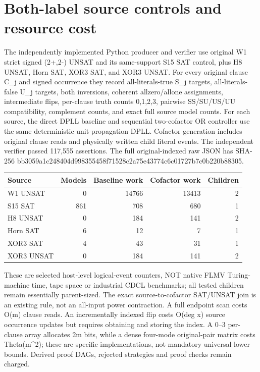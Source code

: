 \documentclass[11pt]{article}
\begin{document}
\section{Both-label source controls and resource cost}
The independently implemented Python producer and verifier use original W1 strict signed (2+,2-) UNSAT and its same-support S15 SAT control, plus H8 UNSAT, Horn SAT, XOR3 SAT, and XOR3 UNSAT. For every original clause C_j and signed occurrence they record all-literals-true S_j targets, all-literals-false U_j targets, both inversions, coherent allzero/allone assignments, intermediate flips, per-clause truth counts 0,1,2,3, pairwise SS/SU/US/UU compatibility, complement counts, and exact full source model counts. For each source, the direct DPLL baseline and sequential two-cofactor OR controller use the same deterministic unit-propagation DPLL. Cofactor generation includes original clause reads and physically written child literal events. The independent verifier passed 117,555 assertions. The full original-indexed raw JSON has SHA-256 bb3059a1c248404d998355458f71528c2a75e43774c6c01727b7c0b220b88305.

\begin{center}\begin{tabular}{lrrrr}\toprule
Source&Models&Baseline work&Cofactor work&Children\\\midrule
W1 UNSAT&0&14766&13413&2\\
S15 SAT&861&708&680&1\\
H8 UNSAT&0&184&141&2\\
Horn SAT&6&12&7&1\\
XOR3 SAT&4&43&31&1\\
XOR3 UNSAT&0&184&141&2\\\bottomrule
\end{tabular}\end{center}
These are selected host-level logical-event counters, NOT native FLMV Turing-machine time, tape space or industrial CDCL benchmarks; all tested children remain essentially parent-sized. The exact source-to-cofactor SAT/UNSAT join is an existing rule, not an all-input power contraction. A full endpoint scan costs O(m) clause reads. An incrementally indexed flip costs O(deg x) source occurrence updates but requires obtaining and storing the index. A 0--3 per-clause array allocates 2m bits, while a dense four-mode original-pair matrix costs Theta(m^2); these are specific implementations, not mandatory universal lower bounds. Derived proof DAGs, rejected strategies and proof checks remain charged.
\end{document}

